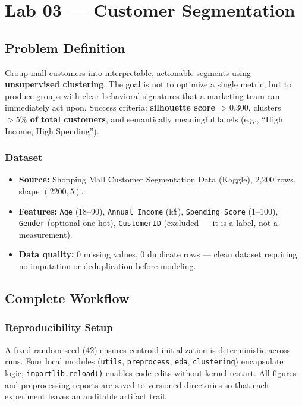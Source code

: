 \chapter{Lab 03 --- Customer Segmentation}
\label{ch:lab03}

\section{Problem Definition}

\begin{problembox}
Group mall customers into interpretable, actionable segments using \textbf{unsupervised clustering}. The goal is not to optimize a single metric, but to produce groups with clear behavioral signatures that a marketing team can immediately act upon. Success criteria: \textbf{silhouette score $> 0.300$}, clusters \textbf{$> 5\%$ of total customers}, and semantically meaningful labels (e.g., ``High Income, High Spending'').
\end{problembox}

\subsection{Dataset}
\begin{itemize}
  \item \textbf{Source:} Shopping Mall Customer Segmentation Data (Kaggle), 2,200 rows, shape $(2200, 5)$.
  \item \textbf{Features:} \texttt{Age} (18--90), \texttt{Annual Income} (k\$), \texttt{Spending Score} (1--100), \texttt{Gender} (optional one-hot), \texttt{CustomerID} (excluded --- it is a label, not a measurement).
  \item \textbf{Data quality:} 0 missing values, 0 duplicate rows --- clean dataset requiring no imputation or deduplication before modeling.
\end{itemize}

\section{Complete Workflow}

\subsection{Reproducibility Setup}
A fixed random seed (42) ensures centroid initialization is deterministic across runs. Four local modules (\texttt{utils}, \texttt{preprocess}, \texttt{eda}, \texttt{clustering}) encapsulate logic; \texttt{importlib.reload()} enables code edits without kernel restart. All figures and preprocessing reports are saved to versioned directories so that each experiment leaves an auditable artifact trail.

